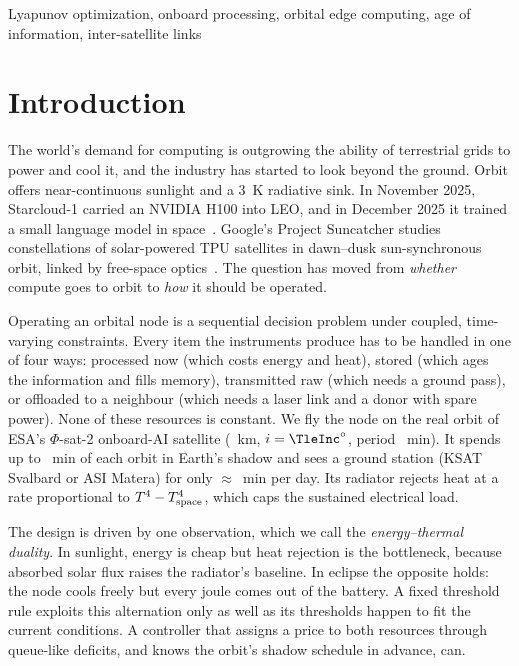 \documentclass[conference]{IEEEtran}
\theoremstyle{remark}
\begin{document}
\begin{IEEEkeywords}
Lyapunov optimization, onboard processing, orbital edge computing, age of information, inter-satellite links
\end{IEEEkeywords}

\section{Introduction}
The world's demand for computing is outgrowing the ability of terrestrial grids to power and cool it, and the industry has started to look beyond the ground. Orbit offers near-continuous sunlight and a \SI{3}{K} radiative sink. In November 2025, Starcloud-1 carried an NVIDIA H100 into LEO, and in December 2025 it trained a small language model in space~\cite{cnbc2025starcloud}. Google's Project Suncatcher studies constellations of solar-powered TPU satellites in dawn--dusk sun-synchronous orbit, linked by free-space optics~\cite{aguera2025suncatcher}. The question has moved from \emph{whether} compute goes to orbit to \emph{how} it should be operated.

Operating an orbital node is a sequential decision problem under coupled, time-varying constraints. Every item the instruments produce has to be handled in one of four ways: processed now (which costs energy and heat), stored (which ages the information and fills memory), transmitted raw (which needs a ground pass), or offloaded to a neighbour (which needs a laser link and a donor with spare power). None of these resources is constant. We fly the node on the real orbit of ESA's $\Phi$-sat-2 onboard-AI satellite (\AltMean~km, $i=\TleInc^\circ$, period \PeriodMin~min). It spends up to \EclMax~min of each orbit in Earth's shadow and sees a ground station (KSAT Svalbard or ASI Matera) for only $\approx$\ContactMin~min per day. Its radiator rejects heat at a rate proportional to $T^4-T_{\rm space}^4$, which caps the sustained electrical load.

The design is driven by one observation, which we call the \emph{energy--thermal duality}. In sunlight, energy is cheap but heat rejection is the bottleneck, because absorbed solar flux raises the radiator's baseline. In eclipse the opposite holds: the node cools freely but every joule comes out of the battery. A fixed threshold rule exploits this alternation only as well as its thresholds happen to fit the current conditions. A controller that assigns a price to both resources through queue-like deficits, and knows the orbit's shadow schedule in advance, can.
\end{document}
